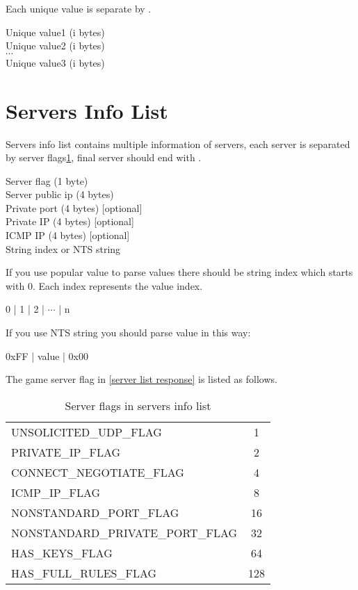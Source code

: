 \documentclass[oneside,titlepage,a4paper]{Definition/retrospy} %
\begin{document}
Each unique value is separate by .
\begin{mybox}[label=unique value list]
	Unique value1 (i bytes)\\
	 Unique value2 (i bytes)\\
	 $\cdots$\\
	 Unique value3 (i bytes)\\
\end{mybox}


\section{Servers Info List}\label{section servers info list}
Servers info list contains multiple information of servers, each server is separated by server flags\ref{Server flags in servers info list}, final server should end with .



\begin{mybox}
	Server flag (1 byte)\\
	Server public ip (4 bytes)\\
	Private port (4 bytes) [optional]\\
	Private IP (4 bytes) [optional]\\
	ICMP IP (4 bytes) [optional]\\
	String index or NTS string
\end{mybox}

If you use popular value to parse values there should be string index which starts with 0. Each index represents the value index.
\begin{mybox}
	0 | 1 | 2 | $ \cdots $ | n
\end{mybox}
If you use NTS string you should parse value in this way:
\begin{mybox}
	0xFF | value | 0x00
\end{mybox}

The game server flag in \ref{server list response} is listed as follows.
\begin{table}[H]
	\centering
	\begin{tabular}{|l|c|}
		\hline
			\tbf{Flag name}&\tbf{Value}	\\\hline
			UNSOLICITED\_UDP\_FLAG &1 \\\hline
			PRIVATE\_IP\_FLAG &2 \\\hline
			CONNECT\_NEGOTIATE\_FLAG  &4\\\hline	
			ICMP\_IP\_FLAG & 8\\\hline
			NONSTANDARD\_PORT\_FLAG & 16\\\hline
			NONSTANDARD\_PRIVATE\_PORT\_FLAG &32 \\\hline
			HAS\_KEYS\_FLAG & 64\\\hline
			HAS\_FULL\_RULES\_FLAG &128 \\\hline 
	\end{tabular}
\caption{Server flags in servers info list}
\label{Server flags in servers info list}
\end{table}
\end{document}
